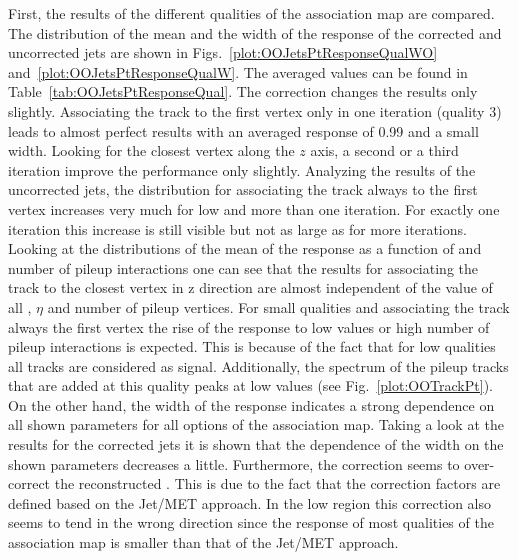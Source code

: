First, the results of the different qualities of the association map are compared. The distribution of the mean and the width of the \pt{} response of the corrected and uncorrected jets are shown in Figs.~\ref{plot:OOJetsPtResponseQualWO} and~\ref{plot:OOJetsPtResponseQualW}. The averaged values can be found in Table~\ref{tab:OOJetsPtResponseQual}. The correction changes the results only slightly. Associating the track to the first vertex only in one iteration (quality 3) leads to almost perfect results with an averaged \pt{} response of 0.99 and a small width. Looking for the closest vertex along the $z$ axis, a second or a third iteration improve the performance only slightly. Analyzing the results of the uncorrected jets, the distribution for associating the track always to the first vertex increases very much for low \pt and more than one iteration. For exactly one iteration this increase is still visible but not as large as for more iterations. Looking at the distributions of the mean of the \pt{} response as a function of \pt and number of pileup interactions one can see that the results for associating the track to the closest vertex in z direction are almost independent of the value of all \pt{}, $\eta$ and number of pileup vertices. For small qualities and associating the track always the first vertex the rise of the \pt{} response to low \pt{} values or high number of pileup interactions is expected. This is because of the fact that for low qualities all tracks are considered as signal. Additionally, the \pt{} spectrum of the pileup tracks that are added at this quality peaks at low values (see Fig.~\ref{plot:OOTrackPt}). On the other hand, the width of the \pt{} response indicates a strong dependence on all shown parameters for all options of the association map. Taking a look at the results for the corrected jets it is shown that the dependence of the width on the shown parameters decreases a little. Furthermore, the correction seems to over-correct the reconstructed \pt. This is due to the fact that the correction factors are defined based on the Jet/MET approach. In the low \pt region this correction also seems to tend in the wrong direction since the \pt{} response of most qualities of the association map is smaller than that of the Jet/MET approach.


